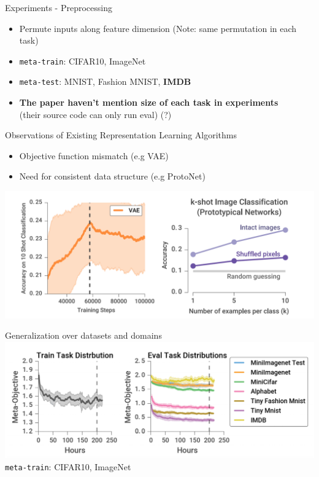 \documentclass{beamer}
\begin{document}
\begin{frame}{Experiments - Preprocessing}
  \begin{itemize}
    \item Permute inputs along feature dimension (Note: same permutation in each task)
    \item \texttt{meta-train}: CIFAR10, ImageNet
    \item \texttt{meta-test}: MNIST, Fashion MNIST, \textbf{IMDB}
  \item \textbf{The paper haven't mention size of each task in experiments} \\
    (their source code can only run eval) (?)
  \end{itemize}
\end{frame}

\begin{frame}{Observations of Existing Representation Learning Algorithms}
  \begin{itemize}
    \item Objective function mismatch (e.g VAE)
    \item Need for consistent data structure (e.g ProtoNet)
  \end{itemize}
  \center \includegraphics[width=\textwidth]{fig/obs.png}
\end{frame}

\begin{frame}{Generalization over datasets and domains}
  \center \includegraphics[width=\textwidth]{fig/lc.png} \\
  \texttt{meta-train}: CIFAR10, ImageNet
\end{frame}
\end{document}
